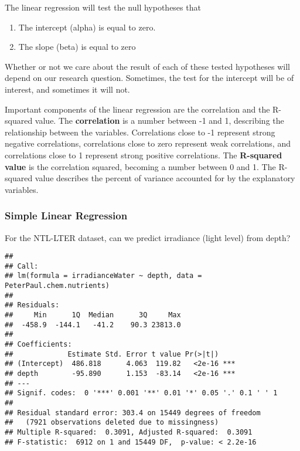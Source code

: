 \documentclass[]{article}
\newenvironment{Shaded}{\begin{snugshade}}{\end{snugshade}}
\newcommand{\KeywordTok}[1]{\textcolor[rgb]{0.13,0.29,0.53}{\textbf{#1}}}
\newcommand{\DataTypeTok}[1]{\textcolor[rgb]{0.13,0.29,0.53}{#1}}
\newcommand{\StringTok}[1]{\textcolor[rgb]{0.31,0.60,0.02}{#1}}
\newcommand{\CommentTok}[1]{\textcolor[rgb]{0.56,0.35,0.01}{\textit{#1}}}
\newcommand{\OperatorTok}[1]{\textcolor[rgb]{0.81,0.36,0.00}{\textbf{#1}}}
\newcommand{\NormalTok}[1]{#1}
\providecommand{\tightlist}{%
  \setlength{\itemsep}{0pt}\setlength{\parskip}{0pt}}
\begin{document}
The linear regression will test the null hypotheses that

\begin{enumerate}
\def\labelenumi{\arabic{enumi}.}
\tightlist
\item
  The intercept (alpha) is equal to zero.
\item
  The slope (beta) is equal to zero
\end{enumerate}

Whether or not we care about the result of each of these tested
hypotheses will depend on our research question. Sometimes, the test for
the intercept will be of interest, and sometimes it will not.

Important components of the linear regression are the correlation and
the R-squared value. The \textbf{correlation} is a number between -1 and
1, describing the relationship between the variables. Correlations close
to -1 represent strong negative correlations, correlations close to zero
represent weak correlations, and correlations close to 1 represent
strong positive correlations. The \textbf{R-squared value} is the
correlation squared, becoming a number between 0 and 1. The R-squared
value describes the percent of variance accounted for by the explanatory
variables.

\subsubsection{Simple Linear Regression}\label{simple-linear-regression}

For the NTL-LTER dataset, can we predict irradiance (light level) from
depth?

\begin{Shaded}
\end{Shaded}

\begin{verbatim}
## 
## Call:
## lm(formula = irradianceWater ~ depth, data = PeterPaul.chem.nutrients)
## 
## Residuals:
##     Min      1Q  Median      3Q     Max 
##  -458.9  -144.1   -41.2    90.3 23813.0 
## 
## Coefficients:
##             Estimate Std. Error t value Pr(>|t|)    
## (Intercept)  486.818      4.063  119.82   <2e-16 ***
## depth        -95.890      1.153  -83.14   <2e-16 ***
## ---
## Signif. codes:  0 '***' 0.001 '**' 0.01 '*' 0.05 '.' 0.1 ' ' 1
## 
## Residual standard error: 303.4 on 15449 degrees of freedom
##   (7921 observations deleted due to missingness)
## Multiple R-squared:  0.3091, Adjusted R-squared:  0.3091 
## F-statistic:  6912 on 1 and 15449 DF,  p-value: < 2.2e-16
\end{verbatim}
\end{document}
